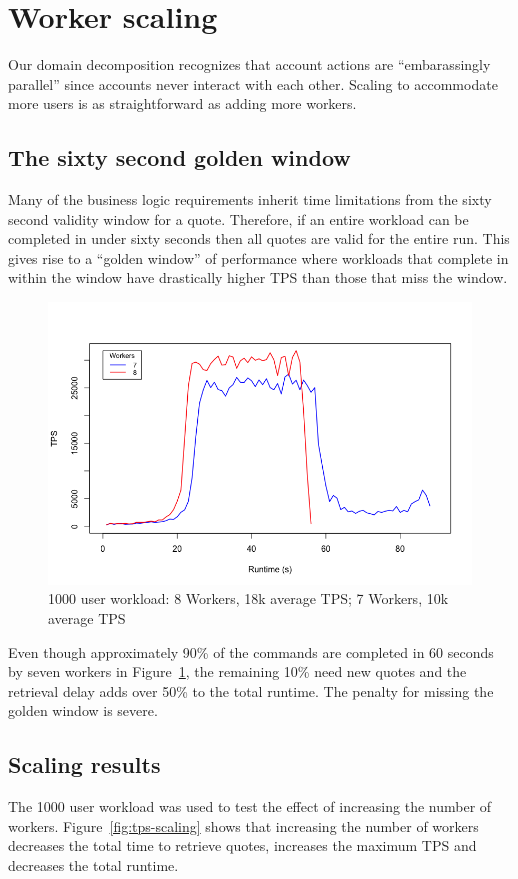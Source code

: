 \section{Worker scaling}
Our domain decomposition recognizes that account actions are ``embarassingly parallel'' since accounts never interact with each other.
Scaling to accommodate more users is as straightforward as adding more workers.

\subsection{The sixty second golden window}
Many of the business logic requirements inherit time limitations from the sixty second validity window for a quote.
Therefore, if an entire workload can be completed in under sixty seconds then all quotes are valid for the entire run.
This gives rise to a ``golden window'' of performance where workloads that complete in within the window have drastically higher TPS than those that miss the window.

\begin{figure}[tbph]
  \centering
  \includegraphics[width=0.7\linewidth]{../graphics/7v8}
  \caption[The golden window effect on TPS]{1000 user workload: 8 Workers, 18k average TPS; 7 Workers, 10k average TPS}
  \label{fig:tps-window}
\end{figure}

Even though approximately 90\% of the commands are completed in 60 seconds by seven workers in Figure~\ref{fig:tps-window}, the remaining 10\% need new quotes and the retrieval delay adds over 50\% to the total runtime.
The penalty for missing the golden window is severe.

\subsection{Scaling results}\label{sec:worker-scaling-results}
The 1000 user workload was used to test the effect of increasing the number of workers.
Figure~\ref{fig:tps-scaling} shows that increasing the number of workers decreases the total time to retrieve quotes, increases the maximum TPS and decreases the total runtime.

